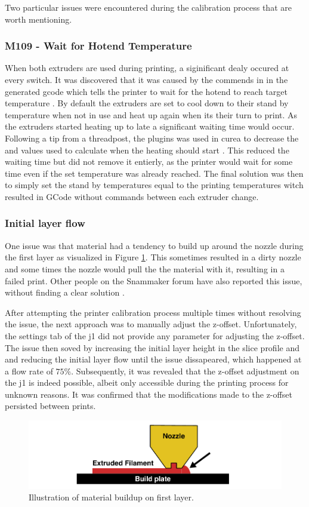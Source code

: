 Two particular issues were encountered during the calibration process that are worth mentioning.


\subsubsection{M109 - Wait for Hotend Temperature}
When both extruders are used during printing, a siginificant dealy occured at every switch.
It was discovered that it was caused by the  commends in in the generated \gls{gcode} which tells the printer to wait for the hotend to reach target temperature \cite{thinkyheadWaitHotendTemperature2023}.
By default the extruders are set to cool down to their stand by temperature when not in use and heat up again when its their turn to print.
As the extruders started heating up to late a significant waiting time would occur.
Following a tip from a threadpost, the  plugins was used in curea to decrease the  and  values used to calculate when the heating should start \cite{valiantReplyStandbyTemperature2022} \cite{fieldofviewPrinterSettingsUltimaker}.
This reduced the waiting time but did not remove it entierly, as the printer would wait for some time even if the set temperature was already reached.
The final solution was then to simply set the stand by temperatures equal to the printing temperatures witch resulted in GCode without  commands between each extruder change.


\subsubsection{Initial layer flow}
One issue was that material had a tendency to build up around the nozzle during the first layer as visualized in Figure \ref{fig:first_layer_buildup}.
This sometimes resulted in a dirty nozzle and some times the nozzle would pull the the material with it, resulting in a failed print.
Other people on the Snammaker forum have also reported this issue, without finding a clear solution \cite{artezioFinerAdjustmentsOffset2021} \cite{napsZHeightCalibrationOffset2023}.

After attempting the printer calibration process multiple times without resolving the issue, the next approach was to manually adjust the z-offset.
Unfortunately, the settings tab of the \gls{j1} did not provide any parameter for adjusting the z-offset.
The issue then soved by increasing the initial layer height in the slice profile and and reducing the initial layer flow until the issue dissapeared, which happened at a flow rate of $75\%$.
Subsequently, it was revealed that the z-offset adjustment on the \gls{j1} is indeed possible, albeit only accessible during the printing process for unknown reasons.
It was confirmed that the modifications made to the z-offset persisted between prints.

\begin{figure}[H]
    \centering
    \includegraphics[width=\textwidth]{figures/3d_print/first_layer_buildup.pdf}
    \caption{Illustration of material buildup on first layer.}
    \label{fig:first_layer_buildup}
\end{figure}